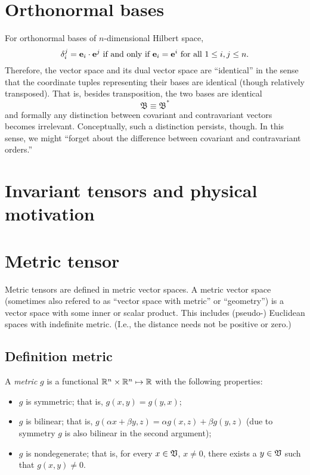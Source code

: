 \section{Orthonormal bases}
For orthonormal bases of $n$-dimensional Hilbert space,
\begin{equation}
\delta_i^j = {\bf e}_i\cdot {\bf e}^j
\textrm { if and only if }
{\bf e}_i= {\bf e}^i  \textrm { for all } 1\le i,j \le n.
\end{equation}
Therefore, the vector space and its dual vector space are ``identical''
in the sense that the coordinate tuples representing their bases are identical
(though relatively transposed).
That is, besides transposition, the two bases are identical
\begin{equation}
{\mathfrak B}\equiv {\mathfrak B}^\ast
\end{equation}
and  formally any distinction between covariant and contravariant vectors becomes
irrelevant. Conceptually, such a distinction persists, though.
In this sense, we might ``forget about the difference between
covariant and contravariant orders.''



\section{Invariant tensors and physical motivation}

\section{Metric tensor}

Metric tensors are defined in metric vector spaces.
A metric vector space (sometimes also refered to
as ``vector space with metric'' or ``geometry'')
is a vector space with some inner or scalar product.
This includes (pseudo-) Euclidean spaces with indefinite metric.
(I.e., the distance needs not be positive or zero.)




\subsection{Definition metric}
\label{2011-m-metrict}

A {\em metric} $g$ is a functional ${\Bbb R}^n\times{\Bbb R}^n\mapsto {\Bbb R}$
with the following properties:
\begin{itemize}
\item
$g$ is symmetric; that is, $g(x,y)=g(y,x)$;
\item
$g$ is bilinear; that is,
$g(
\alpha x + \beta y, z)
= \alpha g( x,z) + \beta g(y, z)
$ (due to symmetry $g$ is also bilinear in the second argument);
\item
$g$ is nondegenerate; that is,
for every $x\in {\frak V}$, $x\neq 0$, there exists a
$y\in {\frak V}$ such that $g(x,y)\neq 0$.
\end{itemize}




